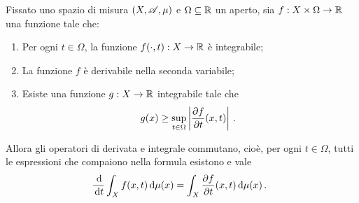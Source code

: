 \begin{proposition} \label{prop:CommutazioneDerivataIntegrale}%
	Fissato uno spazio di misura $(X,\mathscr A,\mu)$ e $\Omega\subseteq\mathbb R$ un aperto, sia $f:X\times\Omega\to\mathbb R$ una funzione tale che:
	\begin{enumerate}
		\item Per ogni $t\in\Omega$, la funzione $f({}\cdot,t):X\to\mathbb R$ è integrabile; \label{it:CommutazioneIntegrabile}
		\item La funzione $f$ è derivabile nella seconda variabile; \label{it:CommutazioneDerivabile}
		\item Esiste una funzione $g:X\to\mathbb R$ integrabile tale che \label{it:CommutazioneDominazione}
		\begin{equation*}
			g(x)\ge \sup_{t\in\Omega}\left\lvert \frac{\partial f}{\partial t}(x,t)\right\rvert \, \text{. }
		\end{equation*}
	\end{enumerate}
	Allora gli operatori di derivata e integrale commutano, cioè, per ogni $t\in\Omega$, tutti le espressioni che compaiono nella formula esistono e vale
	\begin{equation*}
		\frac{\,\mathrm d}{\,\mathrm d t}\int_X f(x,t)\,\mathrm d \mu(x)=\int_X\frac{\partial f}{\partial t}(x,t)\,\mathrm d\mu(x) \, \text{. }
	\end{equation*}
\end{proposition}
